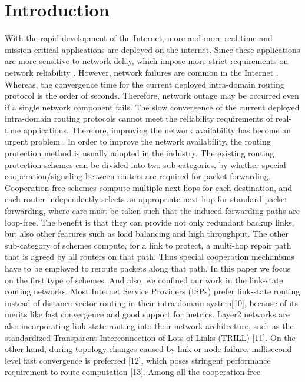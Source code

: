 \section{Introduction}
With the rapid development of the Internet, more and more real-time and mission-critical applications are deployed on the internet. Since these applications are more sensitive to network delay, which impose more strict requirements on network reliability \cite{Zheng}. However, network failures are common in the Internet \cite{20083511494785}. Whereas, the convergence time for the current deployed intra-domain routing protocol is the order of seconds. Therefore, network outage may be occurred even if a single network component fails. The slow convergence of the current deployed intra-domain routing protocols cannot meet the reliability requirements of real-time applications. Therefore, improving the network availability has become an urgent problem \cite{Scalable,Jose2016Optimal,Yang2014Keep,Elhourani2016IP,Liu2013Ensuring,Stephens2016Scalable}. In order to improve the network availability, the routing protection method is usually adopted in
the industry. The existing  routing protection schemes can be divided into two sub-categories, by whether special cooperation/signaling between routers are required for packet forwarding. Cooperation-free schemes compute multiple next-hops for each destination, and each router independently selects an appropriate next-hop for standard packet forwarding, where care must be taken such that the induced forwarding paths are loop-free. The benefit is that they can provide not only redundant backup links, but also other features such as load balancing and high throughput. The other sub-category of schemes compute, for a link to protect, a multi-hop repair path that is agreed by all routers on that path. Thus special cooperation mechanisms have to be employed to reroute packets along that path. In this paper we focus on the first type of schemes. And also, we confined our work in the link-state routing networks. Most Internet Service Providers (ISPs) prefer link-state routing instead of distance-vector routing in their intra-domain system[10], because of its merits like fast convergence and good support for metrics. Layer2 networks are also incorporating link-state routing into their network architecture, such as the standardized Transparent Interconnection of Lots of Links (TRILL) [11]. On the other hand, during topology changes caused by link or node failure, millisecond level fast convergence is preferred [12], which poses stringent performance requirement to route computation [13]. Among all the cooperation-free
